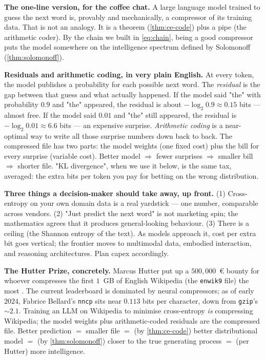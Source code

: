 \begin{intuition}
\textbf{The one-line version, for the coffee chat.}  A large language
model trained to guess the next word is, provably and mechanically,
a compressor of its training data.  That is not an analogy.  It is a
theorem (\cref{thm:ce-code}) plus a pipe (the arithmetic coder).
By the chain we built in \cref{eq:chain}, being a good compressor
puts the model somewhere on the intelligence spectrum defined by
Solomonoff (\cref{thm:solomonoff}).

\textbf{Residuals and arithmetic coding, in very plain English.}
At every token, the model publishes a probability for each possible
next word.  The \emph{residual} is the gap between that guess and
what actually happened.  If the model said "the" with probability
$0.9$ and "the" appeared, the residual is about $-\log_2 0.9 \approx
0.15$ bits --- almost free.  If the model said $0.01$ and "the" still
appeared, the residual is $-\log_2 0.01 \approx 6.6$ bits --- an
expensive surprise.  \emph{Arithmetic coding} is a near-optimal way
to write all those surprise numbers down back to back.  The
compressed file has two parts: the model weights (one fixed cost)
plus the bill for every surprise (variable cost).  Better model
$\Rightarrow$ fewer surprises $\Rightarrow$ smaller bill
$\Rightarrow$ shorter file.  "KL divergence", when we use it below,
is the same tax, averaged: the extra bits per token you pay for
betting on the wrong distribution.

\textbf{Three things a decision-maker should take away, up front.}
(1) Cross-entropy on your own domain data is a real yardstick ---
one number, comparable across vendors.  (2) "Just predict the next
word" is not marketing spin; the mathematics agrees that it produces
general-looking behaviour.  (3) There is a ceiling (the Shannon
entropy of the text).  As models approach it, cost per extra bit
goes vertical; the frontier moves to multimodal data, embodied
interaction, and reasoning architectures.  Plan capex accordingly.

\textbf{The Hutter Prize, concretely.}  Marcus Hutter put up a
$500{,}000$~\euro{} bounty for whoever compresses the first $1$~GB
of English Wikipedia (the \texttt{enwik9} file) the most
\citep{hutter2005universal}.  The current leaderboard is dominated
by neural compressors; as of early $2024$, Fabrice Bellard's
\texttt{nncp} sits near $0.113$ bits per character, down from
\texttt{gzip}'s $\sim 2.1$.  Training an LLM on Wikipedia to
minimise cross-entropy \emph{is} compressing Wikipedia; the model
weights plus arithmetic-coded residuals are the compressed file.
Better prediction $=$ smaller file $=$ (by \cref{thm:ce-code})
better distributional model $=$ (by \cref{thm:solomonoff}) closer
to the true generating process $=$ (per Hutter) more intelligence.


\end{intuition}
